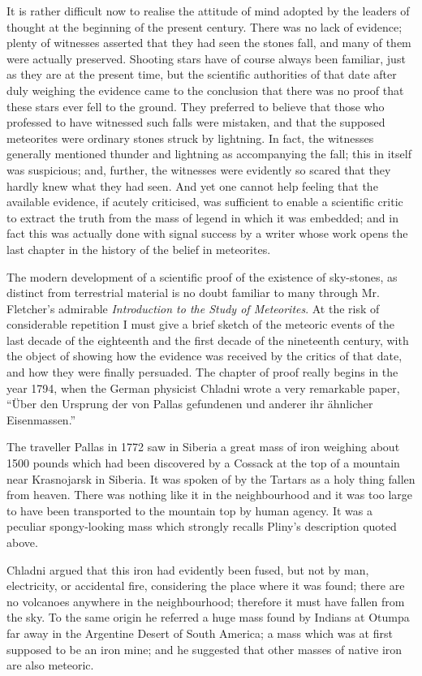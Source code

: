 \documentclass[a4paper, 12pt, oneside]{article}
\begin{document}
It is rather difficult now to realise the attitude of mind adopted by the leaders of thought at the beginning of the present century. There was no lack of evidence; plenty of witnesses asserted that they had seen the stones fall, and many of them were actually preserved. Shooting stars have of course always been familiar, just as they are at the present time, but the scientific authorities of that date after duly weighing the evidence came to the conclusion that there was no proof that these stars ever fell to the ground. They preferred to believe that those who professed to have witnessed such falls were mistaken, and that the supposed meteorites were ordinary stones struck by lightning. In fact, the witnesses generally mentioned thunder and lightning as accompanying the fall; this in itself was suspicious; and, further, the witnesses were evidently so scared that they hardly knew what they had seen. And yet one cannot help feeling that the available evidence, if acutely criticised, was sufficient to enable a scientific critic to extract the truth from the mass of legend in which it was embedded; and in fact this was actually done with signal success by a writer whose work opens the last chapter in the history of the belief in meteorites. 

The modern development of a scientific proof of the existence of sky-stones, as distinct from terrestrial material is no doubt familiar to many through Mr. Fletcher's admirable \emph{Introduction to the Study of Meteorites}. At the risk of considerable repetition I must give a brief sketch of the meteoric events of the last decade of the eighteenth and the first decade of the nineteenth century, with the object of showing how the evidence was received by the critics of that date, and how they were finally persuaded. The chapter of proof really begins in the year 1794, when the German physicist Chladni wrote a very remarkable paper, ``Über den Ursprung der von Pallas gefundenen und anderer ihr ähnlicher Eisenmassen.'' 

The traveller Pallas in 1772 saw in Siberia a great mass of iron weighing about 1500 pounds which had been discovered by a Cossack at the top of a mountain near Krasnojarsk in Siberia. It was spoken of by the Tartars as a holy thing fallen from heaven. There was nothing like it in the neighbourhood and it was too large to have been transported to the mountain top by human agency. It was a peculiar spongy-looking mass which strongly recalls Pliny's description quoted above. 

Chladni argued that this iron had evidently been fused, but not by man, electricity, or accidental fire, considering the place where it was found; there are no volcanoes anywhere in the neighbourhood; therefore it must have fallen from the sky. To the same origin he referred a huge mass found by Indians at Otumpa far away in the Argentine Desert of South America; a mass which was at first supposed to be an iron mine; and he suggested that other masses of native iron are also meteoric. 
\end{document}
